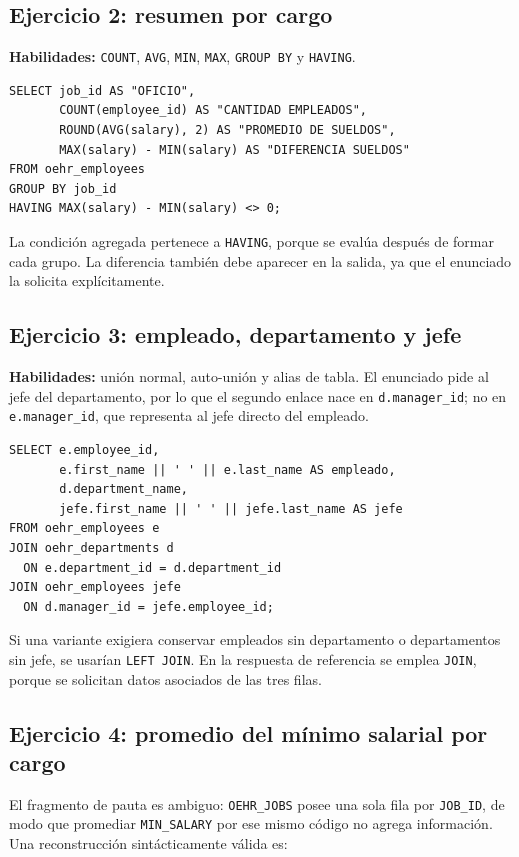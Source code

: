 \documentclass[11pt,a4paper]{article}
\newcommand{\campo}[1]{\texttt{#1}}
\newcommand{\tabla}[1]{\texttt{#1}}
\begin{document}
\subsection{Ejercicio 2: resumen por cargo}

\textbf{Habilidades:} \campo{COUNT}, \campo{AVG}, \campo{MIN}, \campo{MAX},
\campo{GROUP BY} y \campo{HAVING}.

\begin{lstlisting}
SELECT job_id AS "OFICIO",
       COUNT(employee_id) AS "CANTIDAD EMPLEADOS",
       ROUND(AVG(salary), 2) AS "PROMEDIO DE SUELDOS",
       MAX(salary) - MIN(salary) AS "DIFERENCIA SUELDOS"
FROM oehr_employees
GROUP BY job_id
HAVING MAX(salary) - MIN(salary) <> 0;
\end{lstlisting}

La condición agregada pertenece a \campo{HAVING}, porque se evalúa después de formar cada grupo. La
diferencia también debe aparecer en la salida, ya que el enunciado la solicita explícitamente.

\subsection{Ejercicio 3: empleado, departamento y jefe}

\textbf{Habilidades:} unión normal, auto-unión y alias de tabla. El enunciado pide al jefe del
departamento, por lo que el segundo enlace nace en \campo{d.manager\_id}; no en
\campo{e.manager\_id}, que representa al jefe directo del empleado.

\begin{lstlisting}
SELECT e.employee_id,
       e.first_name || ' ' || e.last_name AS empleado,
       d.department_name,
       jefe.first_name || ' ' || jefe.last_name AS jefe
FROM oehr_employees e
JOIN oehr_departments d
  ON e.department_id = d.department_id
JOIN oehr_employees jefe
  ON d.manager_id = jefe.employee_id;
\end{lstlisting}

Si una variante exigiera conservar empleados sin departamento o departamentos sin jefe, se usarían
\campo{LEFT JOIN}. En la respuesta de referencia se emplea \campo{JOIN}, porque se solicitan datos
asociados de las tres filas.

\subsection{Ejercicio 4: promedio del mínimo salarial por cargo}

El fragmento de pauta es ambiguo: \tabla{OEHR\_JOBS} posee una sola fila por \campo{JOB\_ID}, de modo
que promediar \campo{MIN\_SALARY} por ese mismo código no agrega información. Una reconstrucción
sintácticamente válida es:
\end{document}
